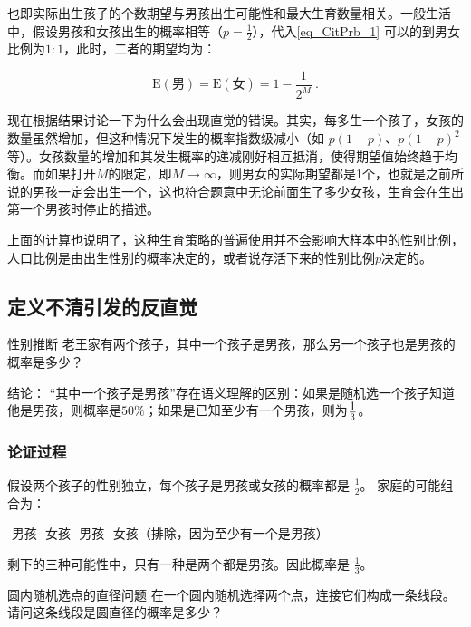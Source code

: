 也即实际出生孩子的个数期望与男孩出生可能性和最大生育数量相关。一般生活中，假设男孩和女孩出生的概率相等（$\displaystyle p = \frac{1}{2}$），代入\autoref{eq_CitPrb_1} 可以的到男女比例为$1:1$，此时，二者的期望均为：

\begin{equation}
\text{E}(\text{男})=\text{E}(\text{女})=1-\frac{1}{2^M}~.
\end{equation}

现在根据结果讨论一下为什么会出现直觉的错误。其实，每多生一个孩子，女孩的数量虽然增加，但这种情况下发生的概率指数级减小（如 $p(1-p)$、$p(1-p)^2$ 等）。女孩数量的增加和其发生概率的递减刚好相互抵消，使得期望值始终趋于均衡。而如果打开$M$的限定，即$M\to\infty$，则男女的实际期望都是1个，也就是之前所说的男孩一定会出生一个，这也符合题意中无论前面生了多少女孩，生育会在生出第一个男孩时停止的描述。

上面的计算也说明了，这种生育策略的普遍使用并不会影响大样本中的性别比例，人口比例是由出生性别的概率决定的，或者说存活下来的性别比例$p$决定的。

\subsection{定义不清引发的反直觉}

\begin{example}{性别推断}
老王家有两个孩子，其中一个孩子是男孩，那么另一个孩子也是男孩的概率是多少？
\end{example}

结论：
“其中一个孩子是男孩”存在语义理解的区别：如果是随机选一个孩子知道他是男孩，则概率是$50\%$；如果是已知至少有一个男孩，则为$\displaystyle 1\over 3$。

\subsubsection{论证过程}
假设两个孩子的性别独立，每个孩子是男孩或女孩的概率都是 $\frac{1}{2}$。
家庭的可能组合为：
\begin{itemize}
-男孩
-女孩
-男孩
-女孩（排除，因为至少有一个是男孩）
\end{itemize}

剩下的三种可能性中，只有一种是两个都是男孩。因此概率是 $\frac{1}{3}$。



\begin{example}{圆内随机选点的直径问题}
在一个圆内随机选择两个点，连接它们构成一条线段。请问这条线段是圆直径的概率是多少？
\end{example}

